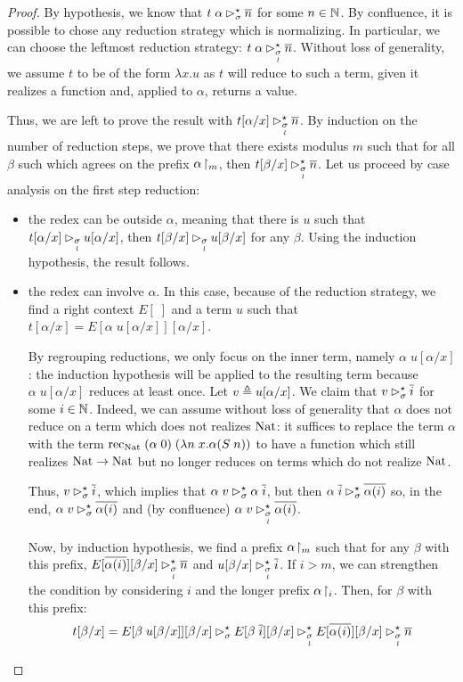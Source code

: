 \documentclass[a4paper,UKenglish,cleveref, autoref, thm-restate]{lipics-v2021}
\begin{document}
\begin{proof}

 By hypothesis, we know that $t\;\alpha \rhd^{\star}_{\sigma} \overline n$ for some $n \in \mathbb N$. By confluence, it is possible to chose any reduction strategy which is normalizing. In particular, we can choose the leftmost reduction strategy:
  $t\;\alpha \rhd^{\star}_{\underset{l}{\sigma}} \overline n$.
  Without loss of generality, we assume $t$ to be of the form $\lambda x.u$ as $t$ will reduce to such a term, given it realizes a function and, applied to $\alpha$, returns a value.

  Thus, we are left to prove the result with $t[\alpha/x] \rhd^{\star}_{\underset{l}{\sigma}} \overline n$. By induction on the number of reduction steps, we prove that there exists modulus $m$ such that for all $\beta$ such which agrees on the prefix ${\alpha}\!\upharpoonright_{m}$, then  $t[\beta/x] \rhd^{\star}_{\underset{l}{\sigma}} \overline n$. Let us proceed by case analysis on the first step reduction:
  \begin{itemize}
  \item the redex can be outside $\alpha$, meaning that there is $u$ such that $t[\alpha/x] \rhd_{\underset{l}{\sigma}} u[\alpha/x]$, then $t[\beta/x] \rhd_{\underset{l}{\sigma}} u[\beta/x]$ for any $\beta$. Using the induction hypothesis, the result follows.
  \item the redex can involve $\alpha$. In this case, because of the reduction strategy, we find a right context $E[\;]$ and a term $u$ such that
    $t[\alpha/x] = E[\alpha\;u[\alpha/x]][\alpha/x]$.

    By regrouping reductions, we only focus on the inner term, namely $\alpha\;u[\alpha/x]$: the induction hypothesis will be applied to the resulting term because $\alpha\;u[\alpha/x]$ reduces at least once. Let $v \triangleq u[\alpha/x]$.
    We claim that $v \rhd^{\star}_{\sigma} \overline i$ for some $i \in \mathbb N$. Indeed, we can assume without loss of generality that $\alpha$ does not reduce on a term which does not realizes $\mathrm{Nat}$: it suffices to replace the term $\alpha$ with the term
    $\mathrm{rec}_{\mathrm{Nat}}\;(\alpha\;0)\;(\lambda n\;x. \alpha(S\;n))$
    to have a function which still realizes $\mathrm{Nat} \to \mathrm{Nat}$ but no longer reduces on terms which do not realize $\mathrm{Nat}$.

    Thus, $v \rhd^{\star}_{\sigma} \overline i$, which implies that $\alpha\;v \rhd^{\star}_{\sigma} \alpha \;\overline i$, but then $\alpha\;\overline i \rhd^{\star}_{\sigma} \overline{\alpha(i)}$ so, in the end,
    $\alpha\;v \rhd^{\star}_{\sigma} \overline{\alpha(i)}$ and (by confluence)
    $\alpha\;v \rhd^{\star}_{\underset{l}{\sigma}} \overline{\alpha(i)}$.

    Now, by induction hypothesis, we find a prefix ${\alpha}\!\upharpoonright_{m}$ such that for any $\beta$ with this prefix, $E[\overline{\alpha(i)}][\beta/x] \rhd^{\star}_{\underset{l}{\sigma}} \overline n$ and $u[\beta/x] \rhd^{\star}_{\underset{l}{\sigma}} \overline i$. If $i>m$, we can strengthen the condition by considering $i$  and the longer prefix ${\alpha}\!\upharpoonright_{i}$. Then, for $\beta$ with this prefix:
    \[t[\beta/x] = E[\beta\;u[\beta/x]][\beta/x] \rhd^{\star}_{\sigma} E[\beta\;\overline i][\beta/x]\rhd^{\star}_{\underset{l}{\sigma}} E[\overline{\alpha(i)}][\beta/x]\rhd^{\star}_{\underset{l}{\sigma}} \overline{n}\]
    

\end{itemize}
\end{proof}
\end{document}
